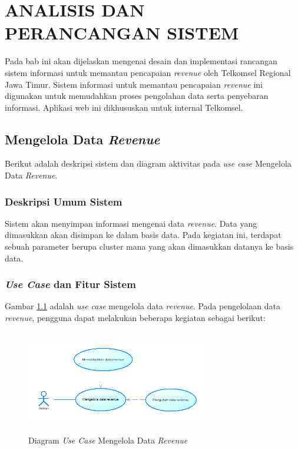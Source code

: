 \chapter{ANALISIS DAN PERANCANGAN SISTEM}
\tab Pada bab ini akan dijelaskan mengenai desain dan implementasi rancangan sistem informasi untuk memantau pencapaian \textit{revenue} oleh Telkomsel Regional Jawa Timur. Sistem informasi untuk memantau pencapaian \textit{revenue} ini digunakan untuk memudahkan proses pengolahan data serta penyebaran informasi. Aplikasi web ini dikhususkan untuk internal Telkomsel.

\section{Mengelola Data \textit{Revenue}}
Berikut adalah deskripsi sistem dan diagram aktivitas pada \textit{use case} Mengelola Data \textit{Revenue}. 
\subsection{Deskripsi Umum Sistem}
\tab Sistem akan menyimpan informasi mengenai data \textit{revenue}. Data yang dimasukkan akan disimpan ke dalam basis data. Pada kegiatan ini, terdapat sebuah parameter berupa cluster mana yang akan dimasukkan datanya ke basis data.
\subsection{\textit{Use Case} dan Fitur Sistem}
Gambar \ref{figure:use_case_mengelola_data_revenue} adalah \textit{use case} mengelola data \textit{revenue}. Pada pengelolaan data \textit{revenue}, pengguna dapat melakukan beberapa kegiatan sebagai berikut:

	\begin{figure}[h]
		\centerline {\includegraphics[width=8cm,height=4.5cm]{bab4/use_case_mengelola_data_revenue.png}}
		\caption{Diagram \textit{Use Case} Mengelola Data \textit{Revenue}}
		\label{figure:use_case_mengelola_data_revenue}
	\end{figure}
	
